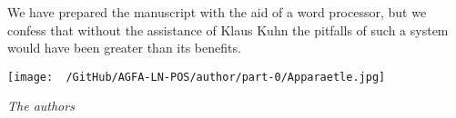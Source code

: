 We have prepared the manuscript with the aid of a word processor, but we confess that without the assistance of Klaus Kuhn the pitfalls of such a system would have been greater than its benefits.

\vspace{.5cm}
\begin{center}
\texttt{[image: ~/GitHub/AGFA-LN-POS/author/part-0/Apparaetle.jpg]}
\end{center}
\vspace{.5cm}
\begin{flushright}\noindent
${}$\hfill {\it The authors} \\
\end{flushright}


